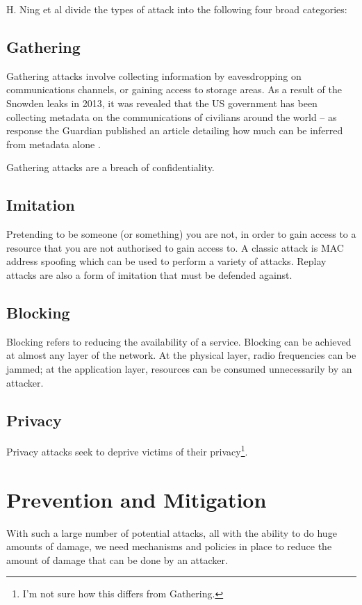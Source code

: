 \documentclass[12pt,journal,compsoc]{IEEEtran}
\begin{document}
H. Ning et al \cite{Ning2013} divide the types of attack into the following
four broad categories:

\subsection{Gathering}
Gathering attacks involve collecting information by eavesdropping on
communications channels, or gaining access to storage areas. As a result of the
Snowden leaks in 2013, it was revealed that the US government has been
collecting metadata on the communications of civilians around the world -- as
response the Guardian published an article detailing how much can be inferred
from metadata alone \cite{Guardian2013}. 

Gathering attacks are a breach of confidentiality. 

\subsection{Imitation}
Pretending to be someone (or something) you are not, in order to gain access to
a resource that you are not authorised to gain access to. A classic attack is
MAC address spoofing which can be used to perform a variety of attacks. Replay
attacks are also a form of imitation that must be defended against. 

\subsection{Blocking}
Blocking refers to reducing the availability of a service. Blocking can be
achieved at almost any layer of the network. At the physical layer, radio
frequencies can be jammed; at the application layer, resources can be consumed
unnecessarily by an attacker.  

\subsection{Privacy}
Privacy attacks seek to deprive victims of their privacy\footnote{I'm not sure
how this differs from Gathering.}.


\section{Prevention and Mitigation}
With such a large number of potential attacks, all with the ability to do huge
amounts of damage, we need mechanisms and policies in place to reduce the
amount of damage that can be done by an attacker. 
\end{document}
